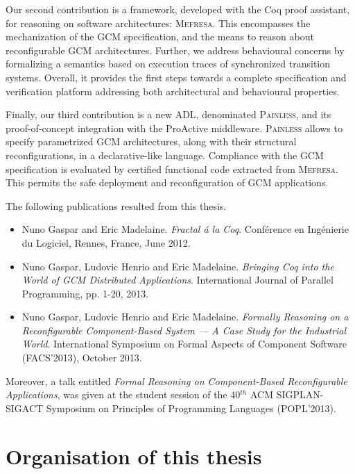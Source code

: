 	Our second contribution is a framework, developed with the Coq proof assistant,
	for reasoning on software architectures: \textsc{Mefresa}. This encompasses
	the mechanization of the \ac{GCM} specification, and the means to
	reason about reconfigurable \ac{GCM} architectures. Further, we address
	behavioural concerns by formalizing a semantics based on execution traces of
	synchronized transition systems.
	Overall, it provides the first steps towards a complete specification and verification
	platform addressing both architectural and behavioural properties.
						
	Finally, our third contribution is a new \ac{ADL}, denominated \textsc{Painless},
	and its proof-of-concept integration with the ProActive middleware. 
	\textsc{Painless} allows to specify parametrized \ac{GCM} architectures, along with
	their structural reconfigurations, in a declarative-like language. Compliance
	with the \ac{GCM} specification is evaluated by certified	 functional code extracted from
	\textsc{Mefresa}. This permits the safe deployment and
	reconfiguration of \ac{GCM} applications.
			
	The following publications resulted from this thesis.
	
	\begin{itemize}
		\item Nuno Gaspar and Eric Madelaine. \textit{Fractal \'a la Coq}.
		Conf\'erence en Ing\'enierie du Logiciel, Rennes, France, June 2012.
		
		\item Nuno Gaspar, Ludovic Henrio and Eric Madelaine. 
		\textit{Bringing Coq into the World of GCM Distributed Applications}.
		International Journal of Parallel Programming, pp. 1-20, 2013.
		
		\item Nuno Gaspar, Ludovic Henrio and Eric Madelaine.
		\textit{Formally Reasoning on a Reconfigurable Component-Based 
		System --- A Case Study for the Industrial World}.
		International Symposium on Formal Aspects of Component 
		Software (FACS'2013), October 2013.  
	\end{itemize}


	Moreover, a talk
	entitled \textit{Formal Reasoning on Component-Based Reconfigurable Applications},
	was given at the student session of the 40$^{th}$ ACM SIGPLAN-SIGACT Symposium on 
	Principles of Programming Languages (POPL'2013).


\section{Organisation of this thesis}
\label{sec:struct}


